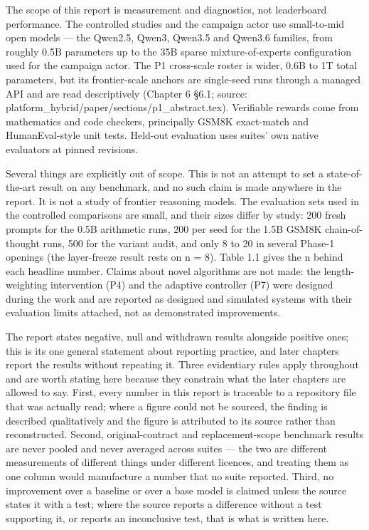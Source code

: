 \documentclass[12pt,a4paper]{report}
\begin{document}
The scope of this report is measurement and diagnostics, not leaderboard
performance. The controlled studies and the campaign actor use
small-to-mid open models --- the Qwen2.5, Qwen3, Qwen3.5 and Qwen3.6
families, from roughly 0.5B parameters up to the 35B sparse
mixture-of-experts configuration used for the campaign actor. The P1
cross-scale roster is wider, 0.6B to 1T total parameters, but its
frontier-scale anchors are single-seed runs through a managed API and
are read descriptively (Chapter 6 §6.1; source:
platform\_hybrid/paper/sections/p1\_abstract.tex). Verifiable rewards
come from mathematics and code checkers, principally GSM8K exact-match
and HumanEval-style unit tests. Held-out evaluation uses suites' own
native evaluators at pinned revisions.

Several things are explicitly out of scope. This is not an attempt to
set a state-of-the-art result on any benchmark, and no such claim is
made anywhere in the report. It is not a study of frontier reasoning
models. The evaluation sets used in the controlled comparisons are
small, and their sizes differ by study: 200 fresh prompts for the 0.5B
arithmetic runs, 200 per seed for the 1.5B GSM8K chain-of-thought runs,
500 for the variant audit, and only 8 to 20 in several Phase-1 openings
(the layer-freeze result rests on n = 8). Table 1.1 gives the n behind
each headline number. Claims about novel algorithms are not made: the
length-weighting intervention (P4) and the adaptive controller (P7) were
designed during the work and are reported as designed and simulated
systems with their evaluation limits attached, not as demonstrated
improvements.

The report states negative, null and withdrawn results alongside
positive ones; this is its one general statement about reporting
practice, and later chapters report the results without repeating it.
Three evidentiary rules apply throughout and are worth stating here
because they constrain what the later chapters are allowed to say.
First, every number in this report is traceable to a repository file
that was actually read; where a figure could not be sourced, the finding
is described qualitatively and the figure is attributed to its source
rather than reconstructed. Second, original-contract and
replacement-scope benchmark results are never pooled and never averaged
across suites --- the two are different measurements of different things
under different licences, and treating them as one column would
manufacture a number that no suite reported. Third, no improvement over
a baseline or over a base model is claimed unless the source states it
with a test; where the source reports a difference without a test
supporting it, or reports an inconclusive test, that is what is written
here.
\end{document}

